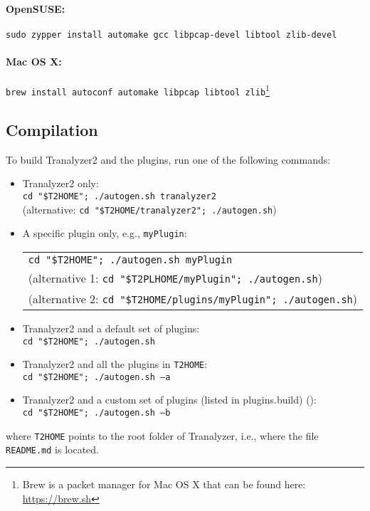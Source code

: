 \paragraph{OpenSUSE:} {\tt sudo zypper install automake gcc libpcap-devel libtool zlib-devel}
\paragraph{Mac OS X:} {\tt brew install autoconf automake libpcap libtool zlib}\footnote{Brew is a packet manager for Mac OS X that can be found here: \url{https://brew.sh}}

\subsection{Compilation}\label{compile}
To build Tranalyzer2 and the plugins, run one of the following commands:

\begin{itemize}
    \item Tranalyzer2 only:\\
        {\tt cd "\$T2HOME"; ./autogen.sh tranalyzer2}\\
        (alternative: {\tt cd "\$T2HOME/tranalyzer2"; ./autogen.sh})
    \item A specific plugin only, e.g., {\tt myPlugin}:\\
        \begin{tabular}{l}
            {\tt cd "\$T2HOME"; ./autogen.sh myPlugin}\\
            (alternative 1: {\tt cd "\$T2PLHOME/myPlugin"; ./autogen.sh})\\
            (alternative 2: {\tt cd "\$T2HOME/plugins/myPlugin"; ./autogen.sh})
        \end{tabular}
    \item Tranalyzer2 and a default set of plugins:\\
        {\tt cd "\$T2HOME"; ./autogen.sh}
    \item Tranalyzer2 and all the plugins in {\tt T2HOME}:\\
        {\tt cd "\$T2HOME"; ./autogen.sh --a}
    \item Tranalyzer2 and a custom set of plugins (listed in plugins.build) ():\\
        {\tt cd "\$T2HOME"; ./autogen.sh --b}
\end{itemize}

where {\tt T2HOME} points to the root folder of Tranalyzer, i.e., where the file {\tt README.md} is located.\\

